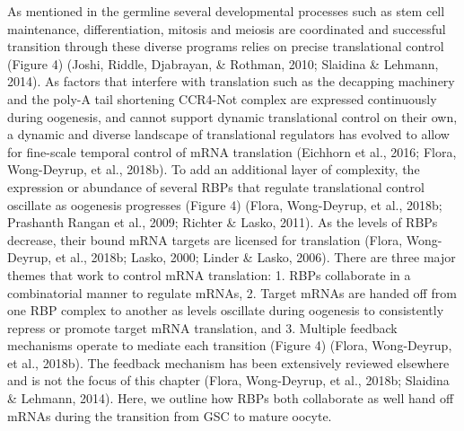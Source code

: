 \documentclass[12pt,oneside]{reedthesis}
\begin{document}
As mentioned in the germline several developmental processes such as
stem cell maintenance, differentiation, mitosis and meiosis are
coordinated and successful transition through these diverse programs
relies on precise translational control (Figure 4) (Joshi, Riddle, Djabrayan, \& Rothman, 2010; Slaidina \& Lehmann, 2014). As factors that interfere with translation such as
the decapping machinery and the poly-A tail shortening CCR4-Not complex
are expressed continuously during oogenesis, and cannot support dynamic
translational control on their own, a dynamic and diverse landscape of
translational regulators has evolved to allow for fine-scale temporal
control of mRNA translation (Eichhorn et al., 2016; Flora, Wong-Deyrup, et al., 2018b). To add an
additional layer of complexity, the expression or abundance of several
RBPs that regulate translational control oscillate as oogenesis
progresses (Figure 4) (Flora, Wong-Deyrup, et al., 2018b; Prashanth Rangan et al., 2009; Richter \& Lasko, 2011). As
the levels of RBPs decrease, their bound mRNA targets are licensed for
translation (Flora, Wong-Deyrup, et al., 2018b; Lasko, 2000; Linder \& Lasko, 2006). There are three
major themes that work to control mRNA translation: 1. RBPs collaborate
in a combinatorial manner to regulate mRNAs, 2. Target mRNAs are handed
off from one RBP complex to another as levels oscillate during oogenesis
to consistently repress or promote target mRNA translation, and 3.
Multiple feedback mechanisms operate to mediate each transition (Figure
4) (Flora, Wong-Deyrup, et al., 2018b). The feedback mechanism has been extensively
reviewed elsewhere and is not the focus of this chapter (Flora, Wong-Deyrup, et al., 2018b; Slaidina \& Lehmann, 2014). Here, we outline how RBPs both collaborate as well
hand off mRNAs during the transition from GSC to mature oocyte.
\end{document}
